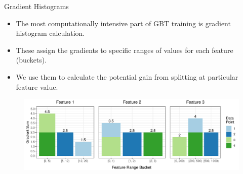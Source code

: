 \documentclass[final]{beamer}
\newlength{\onecolwid}
\begin{document}
\begin{frame}[t]
\begin{columns}[t]
\begin{column}{\onecolwid}
	\begin{block}{Gradient Histograms}
		
		\begin{itemize}
			\item The most computationally intensive part of GBT training is gradient
			histogram calculation.
			
			\item These assign the gradients to specific ranges of values for each
			feature (buckets).
			
			\item We use them to calculate the potential gain from splitting at particular
			feature value.
		\end{itemize}
		
		\begin{figure}
			\includegraphics[width=\onecolwid]{all-features-grad}
			\label{fig:grad-features}
		\end{figure}
		
	\end{block}


\end{column}
\end{columns}
\end{frame}
\end{document}
